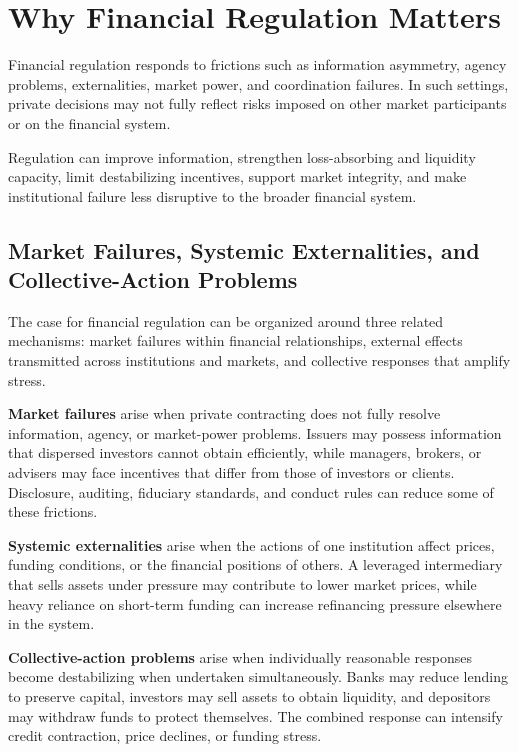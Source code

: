 \section{Why Financial Regulation Matters}

Financial regulation responds to frictions such as information asymmetry, agency problems, externalities, market power, and coordination failures. In such settings, private decisions may not fully reflect risks imposed on other market participants or on the financial system.

Regulation can improve information, strengthen loss-absorbing and liquidity capacity, limit destabilizing incentives, support market integrity, and make institutional failure less disruptive to the broader financial system.

\subsection{Market Failures, Systemic Externalities, and Collective-Action Problems}

The case for financial regulation can be organized around three related mechanisms: market failures within financial relationships, external effects transmitted across institutions and markets, and collective responses that amplify stress.

\textbf{Market failures} arise when private contracting does not fully resolve information, agency, or market-power problems. Issuers may possess information that dispersed investors cannot obtain efficiently, while managers, brokers, or advisers may face incentives that differ from those of investors or clients. Disclosure, auditing, fiduciary standards, and conduct rules can reduce some of these frictions.

\textbf{Systemic externalities} arise when the actions of one institution affect prices, funding conditions, or the financial positions of others. A leveraged intermediary that sells assets under pressure may contribute to lower market prices, while heavy reliance on short-term funding can increase refinancing pressure elsewhere in the system.

\textbf{Collective-action problems} arise when individually reasonable responses become destabilizing when undertaken simultaneously. Banks may reduce lending to preserve capital, investors may sell assets to obtain liquidity, and depositors may withdraw funds to protect themselves. The combined response can intensify credit contraction, price declines, or funding stress.

